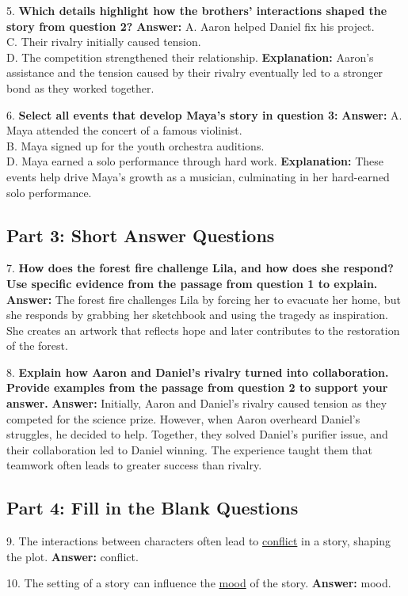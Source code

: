 \documentclass[12pt]{article}
\begin{document}
\vspace{1cm}
5. \textbf{Which details highlight how the brothers’ interactions shaped the story from question 2?}  
\textbf{Answer:} A. Aaron helped Daniel fix his project. \\
C. Their rivalry initially caused tension. \\
D. The competition strengthened their relationship.  
\textbf{Explanation:} Aaron’s assistance and the tension caused by their rivalry eventually led to a stronger bond as they worked together.

\vspace{1cm}
6. \textbf{Select all events that develop Maya’s story in question 3:}  
\textbf{Answer:} A. Maya attended the concert of a famous violinist. \\
B. Maya signed up for the youth orchestra auditions. \\
D. Maya earned a solo performance through hard work.  
\textbf{Explanation:} These events help drive Maya’s growth as a musician, culminating in her hard-earned solo performance.

\subsection*{Part 3: Short Answer Questions}

7. \textbf{How does the forest fire challenge Lila, and how does she respond? Use specific evidence from the passage from question 1 to explain.}  
\textbf{Answer:} The forest fire challenges Lila by forcing her to evacuate her home, but she responds by grabbing her sketchbook and using the tragedy as inspiration. She creates an artwork that reflects hope and later contributes to the restoration of the forest.

\vspace{1cm}
8. \textbf{Explain how Aaron and Daniel’s rivalry turned into collaboration. Provide examples from the passage from question 2 to support your answer.}  
\textbf{Answer:} Initially, Aaron and Daniel’s rivalry caused tension as they competed for the science prize. However, when Aaron overheard Daniel’s struggles, he decided to help. Together, they solved Daniel’s purifier issue, and their collaboration led to Daniel winning. The experience taught them that teamwork often leads to greater success than rivalry.

\subsection*{Part 4: Fill in the Blank Questions}

9. The interactions between characters often lead to \underline{conflict} in a story, shaping the plot.  
\textbf{Answer:} conflict.

10. The setting of a story can influence the \underline{mood} of the story.  
\textbf{Answer:} mood.
\end{document}
